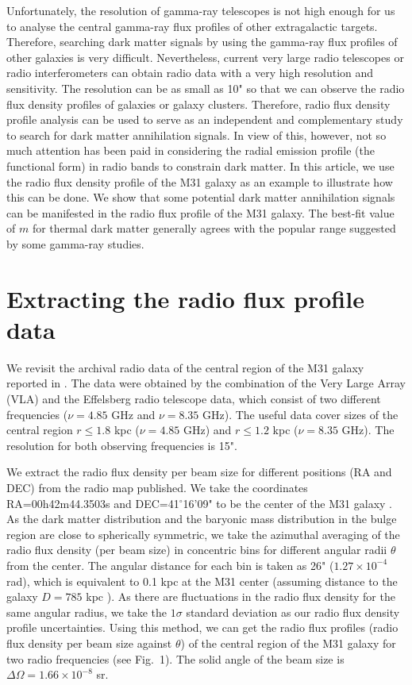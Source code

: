 \documentclass[useAMS,usenatbib]{mn2e}
\begin{document}
Unfortunately, the resolution of gamma-ray telescopes is not high enough for us to analyse the central gamma-ray flux profiles of other extragalactic targets. Therefore, searching dark matter signals by using the gamma-ray flux profiles of other galaxies is very difficult. Nevertheless, current very large radio telescopes or radio interferometers can obtain radio data with a very high resolution and sensitivity. The resolution can be as small as 10" so that we can observe the radio flux density profiles of galaxies or galaxy clusters. Therefore, radio flux density profile analysis can be used to serve as an independent and complementary study to search for dark matter annihilation signals. In view of this, however, not so much attention has been paid in considering the radial emission profile (the functional form) in radio bands to constrain dark matter. In this article, we use the radio flux density profile of the M31 galaxy as an example to illustrate how this can be done. We show that some potential dark matter annihilation signals can be manifested in the radio flux profile of the M31 galaxy. The best-fit value of $m$ for thermal dark matter generally agrees with the popular range suggested by some gamma-ray studies.

\section{Extracting the radio flux profile data}
We revisit the archival radio data of the central region of the M31 galaxy reported in \citet{Giebubel}. The data were obtained by the combination of the Very Large Array (VLA) and the Effelsberg radio telescope data, which consist of two different frequencies ($\nu=4.85$ GHz and $\nu=8.35$ GHz). The useful data cover sizes of the central region $r \le 1.8$ kpc ($\nu=4.85$ GHz) and $r \le 1.2$ kpc ($\nu=8.35$ GHz). The resolution for both observing frequencies is 15".

We extract the radio flux density per beam size for different positions (RA and DEC) from the radio map published. We take the coordinates RA=00h42m44.3503s and DEC=41$^\circ$16'09" to be the center of the M31 galaxy \citep{Evans}. As the dark matter distribution and the baryonic mass distribution in the bulge region are close to spherically symmetric, we take the azimuthal averaging of the radio flux density (per beam size) in concentric bins for different angular radii $\theta$ from the center. The angular distance for each bin is taken as 26" ($1.27\times 10^{-4}$ rad), which is equivalent to 0.1 kpc at the M31 center (assuming distance to the galaxy $D=785$ kpc \citep{Egorov}). As there are fluctuations in the radio flux density for the same angular radius, we take the $1\sigma$ standard deviation as our radio flux density profile uncertainties. Using this method, we can get the radio flux profiles (radio flux density per beam size against $\theta$) of the central region of the M31 galaxy for two radio frequencies (see Fig.~1). The solid angle of the beam size is $\Delta \Omega =1.66 \times 10^{-8}$ sr.
\end{document}
